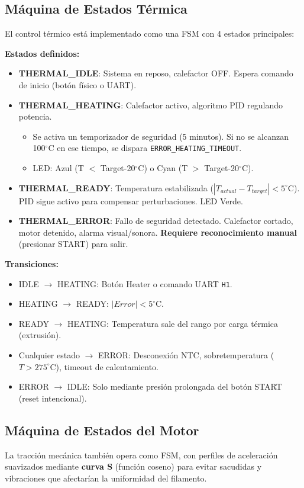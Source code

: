 \documentclass[12pt]{article}
\begin{document}
\subsection{Máquina de Estados Térmica}
El control térmico está implementado como una FSM con 4 estados principales:

\textbf{Estados definidos:}
\begin{itemize}
    \item \textbf{THERMAL\_IDLE}: Sistema en reposo, calefactor OFF. Espera comando de inicio (botón físico o UART).
    \item \textbf{THERMAL\_HEATING}: Calefactor activo, algoritmo PID regulando potencia. 
    \begin{itemize}
        \item Se activa un temporizador de seguridad (5 minutos). Si no se alcanzan 100$^{\circ}$C en ese tiempo, se dispara \texttt{ERROR\_HEATING\_TIMEOUT}.
        \item LED: Azul (T $<$ Target-20$^{\circ}$C) o Cyan (T $>$ Target-20$^{\circ}$C).
    \end{itemize}
    \item \textbf{THERMAL\_READY}: Temperatura estabilizada ($|T_{actual} - T_{target}| < 5^{\circ}$C). PID sigue activo para compensar perturbaciones. LED Verde.
    \item \textbf{THERMAL\_ERROR}: Fallo de seguridad detectado. Calefactor cortado, motor detenido, alarma visual/sonora. \textbf{Requiere reconocimiento manual} (presionar START) para salir.
\end{itemize}

\textbf{Transiciones:}
\begin{itemize}
    \item IDLE $\rightarrow$ HEATING: Botón Heater o comando UART \texttt{H1}.
    \item HEATING $\rightarrow$ READY: $|Error| < 5^{\circ}$C.
    \item READY $\rightarrow$ HEATING: Temperatura sale del rango por carga térmica (extrusión).
    \item Cualquier estado $\rightarrow$ ERROR: Desconexión NTC, sobretemperatura ($T > 275^{\circ}$C), timeout de calentamiento.
    \item ERROR $\rightarrow$ IDLE: Solo mediante presión prolongada del botón START (reset intencional).
\end{itemize}

\subsection{Máquina de Estados del Motor}
La tracción mecánica también opera como FSM, con perfiles de aceleración suavizados mediante \textbf{curva S} (función coseno) para evitar sacudidas y vibraciones que afectarían la uniformidad del filamento.
\end{document}

